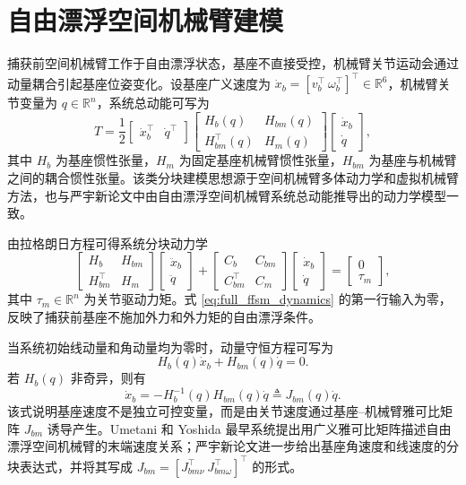 \section{自由漂浮空间机械臂建模}

捕获前空间机械臂工作于自由漂浮状态，基座不直接受控，机械臂关节运动会通过动量耦合引起基座位姿变化。设基座广义速度为 \(\dot x_b=[v_b^\top\ \omega_b^\top]^\top\in\mathbb R^6\)，机械臂关节变量为 \(q\in\mathbb R^n\)，系统总动能可写为
\[
T=\frac12
\begin{bmatrix}
\dot x_b^\top & \dot q^\top
\end{bmatrix}
\begin{bmatrix}
H_b(q) & H_{bm}(q)\\
H_{bm}^\top(q) & H_m(q)
\end{bmatrix}
\begin{bmatrix}
\dot x_b\\
\dot q
\end{bmatrix},
\]
其中 \(H_b\) 为基座惯性张量，\(H_m\) 为固定基座机械臂惯性张量，\(H_{bm}\) 为基座与机械臂之间的耦合惯性张量。该类分块建模思想源于空间机械臂多体动力学和虚拟机械臂方法\cite{vafa1990}，也与严宇新论文中由自由漂浮空间机械臂系统总动能推导出的动力学模型一致\cite{yan}。

由拉格朗日方程可得系统分块动力学
\begin{equation}
\begin{bmatrix}
H_b & H_{bm}\\
H_{bm}^\top & H_m
\end{bmatrix}
\begin{bmatrix}
\ddot x_b\\
\ddot q
\end{bmatrix}
+
\begin{bmatrix}
C_b & C_{bm}\\
C_{bm}^\top & C_m
\end{bmatrix}
\begin{bmatrix}
\dot x_b\\
\dot q
\end{bmatrix}
=
\begin{bmatrix}
0\\
\tau_m
\end{bmatrix},
\label{eq:full_ffsm_dynamics}
\end{equation}
其中 \(\tau_m\in\mathbb R^n\) 为关节驱动力矩。式 \eqref{eq:full_ffsm_dynamics} 的第一行输入为零，反映了捕获前基座不施加外力和外力矩的自由漂浮条件。

当系统初始线动量和角动量均为零时，动量守恒方程可写为
\begin{equation}
H_b(q)\dot x_b+H_{bm}(q)\dot q=0.
\label{eq:momentum_constraint}
\end{equation}
若 \(H_b(q)\) 非奇异，则有
\begin{equation}
\dot x_b=-H_b^{-1}(q)H_{bm}(q)\dot q
\triangleq J_{bm}(q)\dot q.
\label{eq:base_joint_jacobian}
\end{equation}
该式说明基座速度不是独立可控变量，而是由关节速度通过基座--机械臂雅可比矩阵 \(J_{bm}\) 诱导产生。Umetani 和 Yoshida 最早系统提出用广义雅可比矩阵描述自由漂浮空间机械臂的末端速度关系\cite{umetani1989}；严宇新论文进一步给出基座角速度和线速度的分块表达式，并将其写成 \(J_{bm}=[J_{bm\nu}^\top\ J_{bm\omega}^\top]^\top\) 的形式\cite{yan}。

